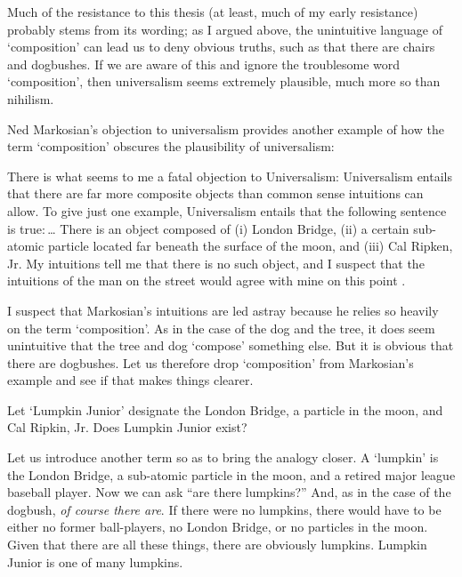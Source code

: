 \documentclass[11pt]{article}
\newenvironment{squote}{%
\begin{spacing}{1}
       	\begin{list}{}{%
\setlength{\labelwidth}{0pt}%
\rightmargin\leftmargin%
}
\item\relax
}{%
\end{list}%
\end{spacing}
}
\begin{document}
\begin{spacing}{1.25}
Much of the resistance to this thesis (at least, much of my early
resistance) probably stems from its wording; as I argued above, the
unintuitive language of `composition' can lead us to deny obvious
truths, such as that there are chairs and dogbushes.  If we are aware
of this and ignore the troublesome word `composition', then
universalism seems extremely plausible, much more so than nihilism.

Ned Markosian's objection to universalism provides another example of
how the term `composition' obscures the plausibility of universalism:

\begin{squote}
There is what seems to me a fatal objection to Universalism:
Universalism entails that there are far more composite objects than
common sense intuitions can allow.  To give just one example,
Universalism entails that the following sentence is true:\,\ldots
There is an object composed of (i) London Bridge, (ii) a certain
sub-atomic particle located far beneath the surface of the moon, and
(iii) Cal Ripken, Jr.  My intuitions tell me that there is no such
object, and I suspect that the intuitions of the man on the street
would agree with mine on this point \citeyearpar[228]{markosian1998a}.
\end{squote}

I suspect that Markosian's intuitions are led astray because he relies
so heavily on the term `composition'.  As in the case of the dog and
the tree, it does seem unintuitive that the tree and dog `compose'
something else.  But it is obvious that there are dogbushes.  Let us
therefore drop `composition' from Markosian's example and see if that
makes things clearer.

Let `Lumpkin Junior' designate the London Bridge, a particle in the
moon, and Cal Ripkin, Jr.  Does Lumpkin Junior exist?

Let us introduce another term so as to bring the analogy closer.  A
`lumpkin' is the London Bridge, a sub-atomic particle in the moon, and
a retired major league baseball player.  Now we can ask ``are there
lumpkins?''  And, as in the case of the dogbush, {\em of course there
  are}.  If there were no lumpkins, there would have to be either no
former ball-players, no London Bridge, or no particles in the moon.
Given that there are all these things, there are obviously lumpkins.
Lumpkin Junior is one of many lumpkins.


\end{spacing}
\end{document}
